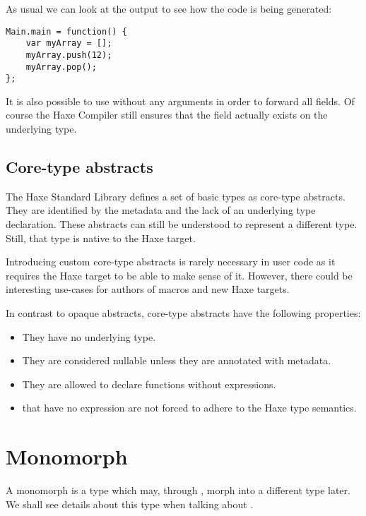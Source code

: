 As usual we can look at the  output to see how the code is being generated:

\begin{lstlisting}
Main.main = function() {
	var myArray = [];
	myArray.push(12);
	myArray.pop();
};
\end{lstlisting}

It is also possible to use  without any arguments in order to forward all fields. Of course the Haxe Compiler still ensures that the field actually exists on the underlying type.



\subsection{Core-type abstracts}
\label{types-abstract-core-type}

The Haxe Standard Library defines a set of basic types as core-type abstracts. They are identified by the  metadata and the lack of an underlying type declaration. These abstracts can still be understood to represent a different type. Still, that type is native to the Haxe target. 

Introducing custom core-type abstracts is rarely necessary in user code as it requires the Haxe target to be able to make sense of it. However, there could be interesting use-cases for authors of macros and new Haxe targets.

In contrast to opaque abstracts, core-type abstracts have the following properties:

\begin{itemize}
	\item They have no underlying type.
	\item They are considered nullable unless they are annotated with  metadata.
	\item They are allowed to declare  functions without expressions.
	\item {} that have no expression are not forced to adhere to the Haxe type semantics.
\end{itemize}



\section{Monomorph}
\label{types-monomorph}

A monomorph is a type which may, through , morph into a different type later. We shall see details about this type when talking about .
